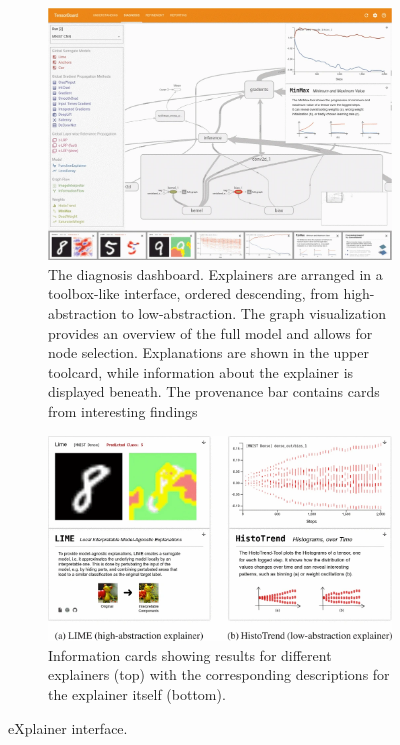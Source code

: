 \begin{figure}
    \centering
    \begin{subfigure}[c]{0.6\textwidth}
        \centering
        \includegraphics[width=\textwidth]{images/eXplainer dashboard.png}
        \caption{The diagnosis dashboard. Explainers are arranged in a
toolbox-like interface, ordered descending, from high-abstraction to
low-abstraction. The graph visualization provides an overview of the
full model and allows for node selection. Explanations are shown in
the upper toolcard, while information about the explainer is displayed
beneath. The provenance bar contains cards from interesting findings}
        \label{fig:eXplainer_dashboard}
    \end{subfigure}
    \hfill
    \begin{subfigure}[c]{0.39\textwidth}
        \centering
        \includegraphics[width=\textwidth]{images/eXplainer card.png}
        \caption{Information cards showing results for different explainers (top)
with the corresponding descriptions for the explainer itself (bottom).}
        \label{fig:eXplainer_cards}
    \end{subfigure}
    \caption{eXplainer interface.}
    \label{fig:eXplainer}
\end{figure}

